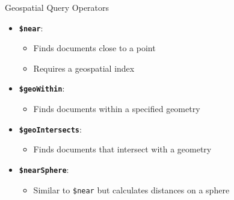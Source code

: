 \documentclass[aspectratio=169]{beamer}
\begin{document}
\begin{frame}{Geospatial Query Operators}
  \begin{itemize}
    \item \textbf{\texttt{\$near}}:
      \begin{itemize}
        \item Finds documents close to a point
        \item Requires a geospatial index
      \end{itemize}
    \item \textbf{\texttt{\$geoWithin}}:
      \begin{itemize}
        \item Finds documents within a specified geometry
      \end{itemize}
    \item \textbf{\texttt{\$geoIntersects}}:
      \begin{itemize}
        \item Finds documents that intersect with a geometry
      \end{itemize}
    \item \textbf{\texttt{\$nearSphere}}:
      \begin{itemize}
        \item Similar to \texttt{\$near} but calculates distances on a sphere
      \end{itemize}
  \end{itemize}
\end{frame}

\end{document}
